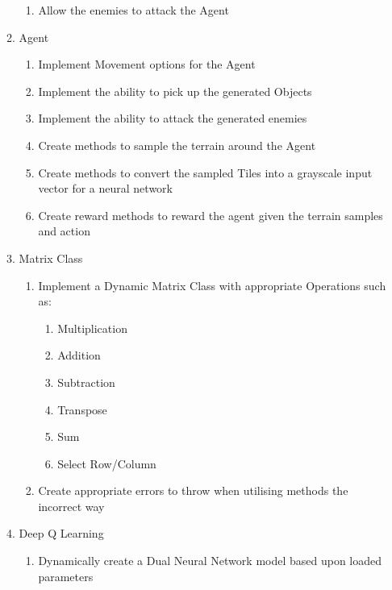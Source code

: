 \begin{flushleft}
\begin{enumerate}
\begin{enumerate}
\begin{enumerate}
                        \item Allow the enemies to attack the Agent
                    \end{enumerate}   
                \item Agent
                    \begin{enumerate}
                        \item Implement Movement options for the Agent
                        \item Implement the ability to pick up the generated Objects
                        \item Implement the ability to attack the generated enemies
                        \item Create methods to sample the terrain around the Agent
                        \item Create methods to convert the sampled Tiles into a grayscale input vector for a neural network
                        \item Create reward methods to reward the agent given the terrain samples and action
                    \end{enumerate}   
                \item Matrix Class
                    \begin{enumerate}
                        \item Implement a Dynamic Matrix Class with appropriate Operations such as:
                            \begin{enumerate}
                                \item Multiplication
                                \item Addition
                                \item Subtraction
                                \item Transpose
                                \item Sum
                                \item Select Row/Column
                            \end{enumerate}
                        \item Create appropriate errors to throw when utilising methods the incorrect way
                    \end{enumerate}   
                \item Deep Q Learning
                    \begin{enumerate}
                        \item Dynamically create a Dual Neural Network model based upon loaded parameters

\end{enumerate}
\end{enumerate}
\end{enumerate}
\end{flushleft}
